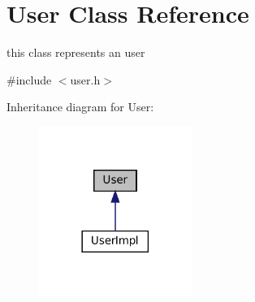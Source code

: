 \hypertarget{classUser}{}\section{User Class Reference}
\label{classUser}


this class represents an user  




{\ttfamily \#include $<$user.\+h$>$}



Inheritance diagram for User\+:\nopagebreak
\begin{figure}[H]
\begin{center}
\leavevmode
\includegraphics[width=141pt]{classUser__inherit__graph}
\end{center}
\end{figure}
